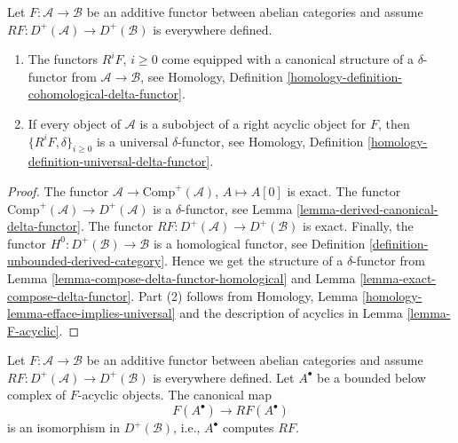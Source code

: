 \begin{lemma}
\label{lemma-right-derived-delta-functor}
Let $F : \mathcal{A} \to \mathcal{B}$ be an additive functor
between abelian categories and assume
$RF : D^{+}(\mathcal{A}) \to D^{+}(\mathcal{B})$ is everywhere defined.
\begin{enumerate}
\item The functors $R^iF$, $i \geq 0$ come equipped with a canonical
structure of a $\delta$-functor from $\mathcal{A} \to \mathcal{B}$, see
Homology, Definition \ref{homology-definition-cohomological-delta-functor}.
\item If every object of $\mathcal{A}$ is a subobject of a right
acyclic object for $F$, then $\{R^iF, \delta\}_{i \geq 0}$ is a
universal $\delta$-functor, see
Homology, Definition \ref{homology-definition-universal-delta-functor}.
\end{enumerate}
\end{lemma}

\begin{proof}
The functor $\mathcal{A} \to \text{Comp}^{+}(\mathcal{A})$,
$A \mapsto A[0]$ is exact. The functor
$\text{Comp}^{+}(\mathcal{A}) \to D^{+}(\mathcal{A})$
is a $\delta$-functor, see
Lemma \ref{lemma-derived-canonical-delta-functor}.
The functor $RF : D^{+}(\mathcal{A}) \to D^{+}(\mathcal{B})$ is exact.
Finally, the functor $H^0 : D^{+}(\mathcal{B}) \to \mathcal{B}$
is a homological functor, see
Definition \ref{definition-unbounded-derived-category}.
Hence we get the structure of a $\delta$-functor from
Lemma \ref{lemma-compose-delta-functor-homological}
and
Lemma \ref{lemma-exact-compose-delta-functor}.
Part (2) follows from
Homology, Lemma \ref{homology-lemma-efface-implies-universal}
and the description of acyclics in
Lemma \ref{lemma-F-acyclic}.
\end{proof}

\begin{lemma}
\label{lemma-leray-acyclicity}
Let $F : \mathcal{A} \to \mathcal{B}$ be an additive functor
between abelian categories and assume
$RF : D^{+}(\mathcal{A}) \to D^{+}(\mathcal{B})$ is everywhere defined.
Let $A^\bullet$ be a bounded below complex of $F$-acyclic objects.
The canonical map
$$
F(A^\bullet) \longrightarrow RF(A^\bullet)
$$
is an isomorphism in $D^{+}(\mathcal{B})$, i.e., $A^\bullet$ computes
$RF$.
\end{lemma}

